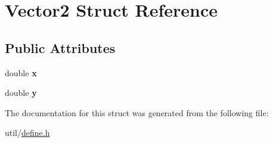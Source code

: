 \hypertarget{struct_vector2}{}\section{Vector2 Struct Reference}
\label{struct_vector2}
\subsection*{Public Attributes}
\begin{DoxyCompactItemize}
\item 
\mbox{\label{struct_vector2_a61d73d9036ccbb3257fbe595c014a1d0}} 
double {\bfseries x}
\item 
\mbox{\label{struct_vector2_a4df9b2a8e79e6e30a7a3b34722d8b8b8}} 
double {\bfseries y}
\end{DoxyCompactItemize}


The documentation for this struct was generated from the following file\+:\begin{DoxyCompactItemize}
\item 
util/\mbox{\hyperlink{define_8h}{define.\+h}}\end{DoxyCompactItemize}

